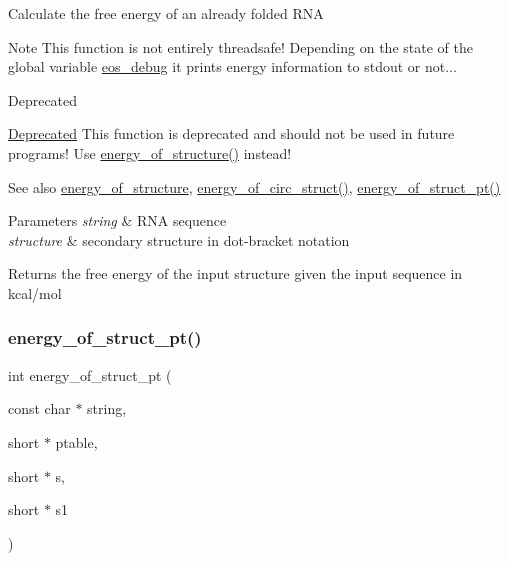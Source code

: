 Calculate the free energy of an already folded R\+NA

\begin{DoxyNote}{Note}
This function is not entirely threadsafe! Depending on the state of the global variable \hyperlink{group__eval_ga567530678f6260a1a649a5beca5da4c5}{eos\+\_\+debug} it prints energy information to stdout or not...~\newline
 
\end{DoxyNote}
\begin{DoxyRefDesc}{Deprecated}
\item[\hyperlink{deprecated__deprecated000061}{Deprecated}]This function is deprecated and should not be used in future programs! Use \hyperlink{group__eval_gaf93986cb3cb29770ec9cca69c9fab8cf}{energy\+\_\+of\+\_\+structure()} instead!\end{DoxyRefDesc}


\begin{DoxySeeAlso}{See also}
\hyperlink{group__eval_gaf93986cb3cb29770ec9cca69c9fab8cf}{energy\+\_\+of\+\_\+structure}, \hyperlink{group__eval_ga657222e2758c46bf13b416ef3032e417}{energy\+\_\+of\+\_\+circ\+\_\+struct()}, \hyperlink{group__eval_ga27ce6f68512d43bf1fe14a06c9d76d5c}{energy\+\_\+of\+\_\+struct\+\_\+pt()} 
\end{DoxySeeAlso}

\begin{DoxyParams}{Parameters}
{\em string} & R\+NA sequence \\
\hline
{\em structure} & secondary structure in dot-\/bracket notation \\
\hline
\end{DoxyParams}
\begin{DoxyReturn}{Returns}
the free energy of the input structure given the input sequence in kcal/mol 
\end{DoxyReturn}
\mbox{\label{group__eval_ga27ce6f68512d43bf1fe14a06c9d76d5c}} 
\subsubsection{\texorpdfstring{energy\+\_\+of\+\_\+struct\+\_\+pt()}{energy\_of\_struct\_pt()}}
{\footnotesize\ttfamily int energy\+\_\+of\+\_\+struct\+\_\+pt (\begin{DoxyParamCaption}\item[{const char $\ast$}]{string,  }\item[{short $\ast$}]{ptable,  }\item[{short $\ast$}]{s,  }\item[{short $\ast$}]{s1 }\end{DoxyParamCaption})}




